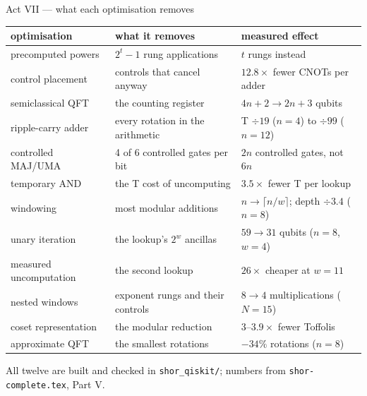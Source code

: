 \documentclass[aspectratio=169,11pt]{beamer}
\begin{document}
\begin{frame}{Act VII --- what each optimisation removes}
  \centering\footnotesize
  \renewcommand{\arraystretch}{1.06}
  \begin{tabular}{@{}lll@{}}
    \toprule
    optimisation & what it removes & measured effect \\
    \midrule
    precomputed powers & $2^t-1$ rung applications & $t$ rungs instead \\
    control placement & controls that cancel anyway & $12.8\times$ fewer CNOTs per adder \\
    semiclassical QFT & the counting register & $4n+2\to2n+3$ qubits \\
    ripple-carry adder & every rotation in the arithmetic & T $\div19$ ($n=4$) to $\div99$ ($n=12$) \\
    controlled MAJ/UMA & 4 of 6 controlled gates per bit & $2n$ controlled gates, not $6n$ \\
    temporary AND & the T cost of uncomputing & $3.5\times$ fewer T per lookup \\
    windowing & most modular additions & $n\to\lceil n/w\rceil$; depth $\div3.4$ ($n=8$) \\
    unary iteration & the lookup's $2^w$ ancillas & $59\to31$ qubits ($n=8$, $w=4$) \\
    measured uncomputation & the second lookup & $26\times$ cheaper at $w=11$ \\
    nested windows & exponent rungs and their controls & $8\to4$ multiplications ($N=15$) \\
    coset representation & the modular reduction & $3$--$3.9\times$ fewer Toffolis \\
    approximate QFT & the smallest rotations & $-34\%$ rotations ($n=8$) \\
    \bottomrule
  \end{tabular}
  \begin{takeaway}All twelve are built and checked in \texttt{shor\_qiskit/}; numbers from \texttt{shor-complete.tex}, Part V.\end{takeaway}
\end{frame}
\end{document}
